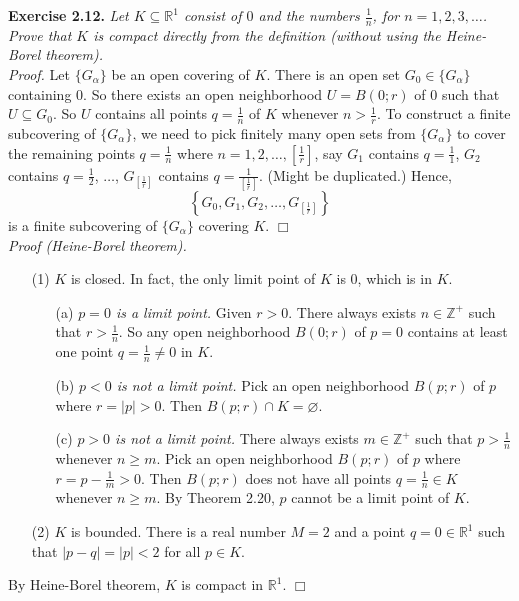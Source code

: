 \documentclass{article}
\begin{document}



\textbf{Exercise 2.12.}
\emph{Let $K \subseteq \mathbb{R}^1$
consist of $0$ and the numbers $\frac{1}{n}$, for $n = 1, 2, 3, \ldots$.
Prove that $K$ is compact directly from the definition
(without using the Heine-Borel theorem).} \\

\emph{Proof.}
Let $\{ G_{\alpha} \}$ be an open covering of $K$.
There is an open set $G_0 \in \{ G_{\alpha} \}$ containing $0$.
So there exists an open neighborhood $U = B(0;r)$ of $0$ such that $U \subseteq G_0$.
So $U$ contains all points $q = \frac{1}{n}$ of $K$ whenever $n > \frac{1}{r}$.
To construct a finite subcovering of $\{ G_{\alpha} \}$,
we need to pick finitely many open sets from $\{ G_{\alpha} \}$
to cover the remaining points $q = \frac{1}{n}$ where $n = 1, 2, \ldots, \left[\frac{1}{r}\right]$,
say $G_1$ contains $q = \frac{1}{1}$, $G_2$ contains $q = \frac{1}{2}$, $\ldots$,
$G_{\left[\frac{1}{r}\right]}$ contains $q = \frac{1}{\left[\frac{1}{r}\right]}$.
(Might be duplicated.)
Hence,
$$\left\{ G_0, G_1, G_2, \ldots, G_{\left[\frac{1}{r}\right]} \right\}$$
is a finite subcovering of $\{ G_{\alpha} \}$ covering $K$.
$\Box$ \\

\emph{Proof (Heine-Borel theorem).}
\begin{enumerate}
\item[(1)]
$K$ is closed. In fact, the only limit point of $K$ is $0$, which is in $K$.
\begin{enumerate}
\item[(a)]
\emph{$p = 0$ is a limit point.}
Given $r > 0$.
There always exists $n \in \mathbb{Z}^{+}$ such that $r > \frac{1}{n}$.
So any open neighborhood $B(0;r)$ of $p = 0$
contains at least one point $q = \frac{1}{n} \neq 0$ in $K$.
\item[(b)]
\emph{$p < 0$ is not a limit point.}
Pick an open neighborhood $B(p;r)$ of $p$ where $r = |p| > 0$.
Then $B(p;r) \cap K = \varnothing$.
\item[(c)]
\emph{$p > 0$ is not a limit point.}
There always exists $m \in \mathbb{Z}^+$ such that $p > \frac{1}{n}$ whenever $n \geq m$.
Pick an open neighborhood $B(p;r)$ of $p$ where $r = p - \frac{1}{m} > 0$.
Then $B(p;r)$ does not have all points $q = \frac{1}{n} \in K$ whenever $n \geq m$.
By Theorem 2.20, $p$ cannot be a limit point of $K$.
\end{enumerate}
\item[(2)]
$K$ is bounded. There is a real number $M = 2$ and a point $q = 0 \in \mathbb{R}^1$
such that $|p - q| = |p| < 2$ for all $p \in K$.
\end{enumerate}
By Heine-Borel theorem, $K$ is compact in $\mathbb{R}^1$.
$\Box$ \\\\
\end{document}
